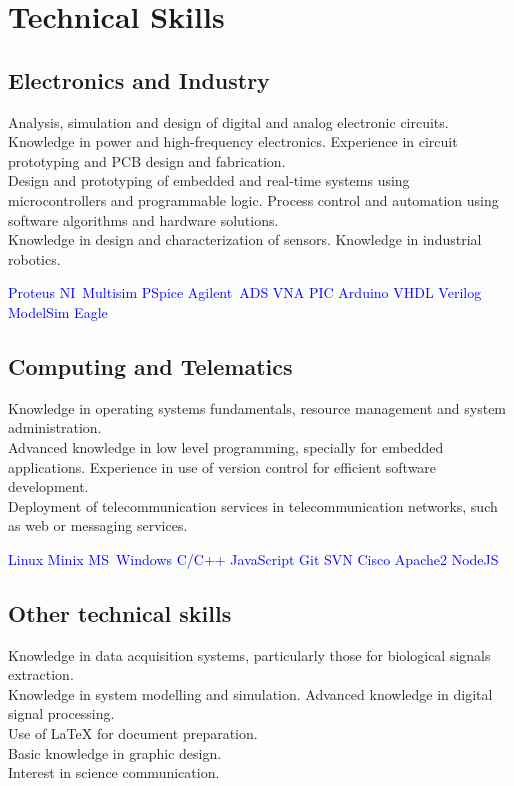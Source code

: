 \documentclass[11pt,a4paper,sans,spanish]{moderncv}
\begin{document}
 
\section{Technical Skills}

\subsection{Electronics and Industry}
Analysis, simulation and design of digital and analog electronic circuits. Knowledge in power and high-frequency electronics. Experience in circuit prototyping and PCB design and fabrication.
\protect\\[0.4em]
Design and prototyping of embedded and real-time systems using microcontrollers and programmable logic.
Process control and automation using software algorithms and hardware solutions.
\protect\\[0.4em]
Knowledge in design and characterization of sensors. Knowledge in industrial robotics.

\begin{center}
\textcolor{blue}{
Proteus \quad{} NI~Multisim \quad{} PSpice \quad{} Agilent~ADS \quad{} VNA \quad{} PIC \quad{} Arduino \quad{} VHDL \quad{} Verilog \quad{} ModelSim \quad{} Eagle
}
\end{center}

\subsection{Computing and Telematics}
Knowledge in operating systems fundamentals, resource management and system administration.
\protect\\[0.4em]
Advanced knowledge in low level programming, specially for embedded applications.
Experience in use of version control for efficient software development.
\protect\\[0.4em]
Deployment of telecommunication services in telecommunication networks, such as web or messaging services.

\begin{center}
\textcolor{blue}{
Linux \quad{} Minix \quad{} MS~Windows \quad{} C/C++ \quad{} JavaScript \quad{} Git \quad{} SVN \quad{} Cisco \quad{} Apache2 \quad{} NodeJS
}
\end{center}

\subsection{Other technical skills}
Knowledge in data acquisition systems, particularly those for biological signals extraction.
\protect\\[0.4em]
Knowledge in system modelling and simulation.
Advanced knowledge in digital signal processing.
\protect\\[0.4em]
Use of LaTeX for document preparation.
\protect\\[0.4em]
Basic knowledge in graphic design.
\protect\\[0.4em]
Interest in science communication.
\end{document}
